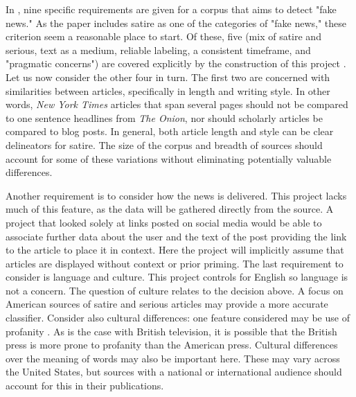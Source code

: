 \documentclass [12 pt] {report}
\begin{document}
In \cite{threeTypes}, nine specific requirements are given for a corpus that aims to detect "fake news." As the paper includes satire as one of the categories of "fake news," these criterion seem a reasonable place to start. Of these, five (mix of satire and serious, text as a medium, reliable labeling, a consistent timeframe, and "pragmatic concerns") are covered explicitly by the construction of this project \cite{threeTypes}. Let us now consider the other four in turn. The first two are concerned with similarities between articles, specifically in length and writing style. In other words, \textit{New York Times} articles that span several pages should not be compared to one sentence headlines from \textit{The Onion}, nor should scholarly articles be compared to blog posts. In general, both article length and style can be clear delineators for satire. The size of the corpus and breadth of sources should account for some of these variations without eliminating potentially valuable differences.

Another requirement is to consider how the news is delivered. This project lacks much of this feature, as the data will be gathered directly from the source. A project that looked solely at links posted on social media would be able to associate further data about the user and the text of the post providing the link to the article to place it in context. Here the project will implicitly assume that articles are displayed without context or prior priming. The last requirement to consider is language and culture. This project controls for English so language is not a concern. The question of culture relates to the decision above. A focus on American sources of satire and serious articles may provide a more accurate classifier. Consider also cultural differences: one feature considered may be use of profanity \cite{Burfoot}. As is the case with British television, it is possible that the British press is more prone to profanity than the American press. Cultural differences over the meaning of words may also be important here. These may vary across the United States, but sources with a national or international audience should account for this in their publications.
\end{document}
